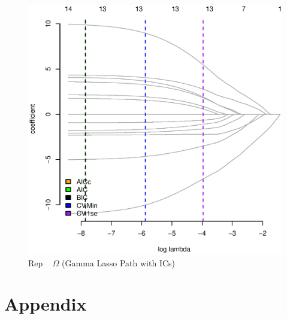 \documentclass[11pt, fleqn]{article}
\begin{document}
\begin{figure}[!htb]
  \centering
  \includegraphics[scale=.5]{tpcs_rep.eps}
  \caption{Rep ~ $\Omega$ (Gamma Lasso Path with ICs)}
  \label{fig:tpcs_rep}
\end{figure}


\section{Appendix}







% 
% 
% 
% 


% 

\end{document}
